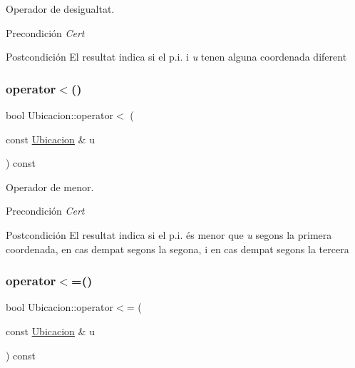 Operador de desigualtat. 

\begin{DoxyPrecond}{Precondición}
{\itshape Cert} 
\end{DoxyPrecond}
\begin{DoxyPostcond}{Postcondición}
El resultat indica si el p.\+i. i {\itshape u} tenen alguna coordenada diferent 
\end{DoxyPostcond}
\mbox{\label{class_ubicacion_a4d19b7ea907107a1c25677c3785a0a69}} 
\subsubsection{\texorpdfstring{operator$<$()}{operator<()}}
{\footnotesize\ttfamily bool Ubicacion\+::operator$<$ (\begin{DoxyParamCaption}\item[{const \hyperlink{class_ubicacion}{Ubicacion} \&}]{u }\end{DoxyParamCaption}) const}



Operador de menor. 

\begin{DoxyPrecond}{Precondición}
{\itshape Cert} 
\end{DoxyPrecond}
\begin{DoxyPostcond}{Postcondición}
El resultat indica si el p.\+i. és menor que {\itshape u} segons la primera coordenada, en cas d\textquotesingle{}empat segons la segona, i en cas d\textquotesingle{}empat segons la tercera 
\end{DoxyPostcond}
\mbox{\label{class_ubicacion_ac3b54c312d4e2e01c6bda1205b39ae3b}} 
\subsubsection{\texorpdfstring{operator$<$=()}{operator<=()}}
{\footnotesize\ttfamily bool Ubicacion\+::operator$<$= (\begin{DoxyParamCaption}\item[{const \hyperlink{class_ubicacion}{Ubicacion} \&}]{u }\end{DoxyParamCaption}) const}



